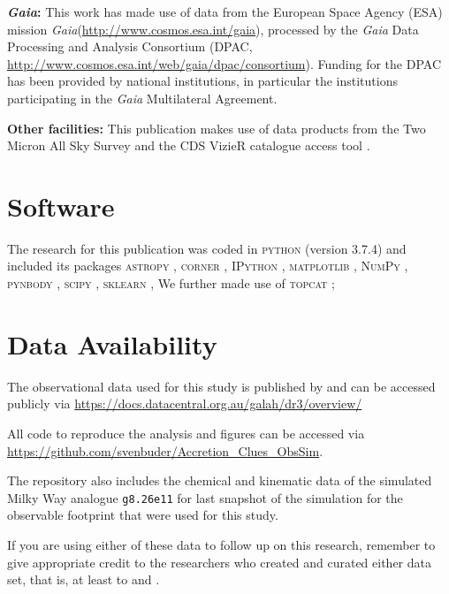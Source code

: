 \documentclass[fleqn,usenatbib]{mnras}
\newcommand{\Gaia}{\textit{Gaia}\xspace} %
\begin{document}
\textbf{\Gaia: } This work has made use of data from the European Space Agency (ESA) mission \Gaia (\url{http://www.cosmos.esa.int/gaia}), processed by the \Gaia Data Processing and Analysis Consortium (DPAC, \url{http://www.cosmos.esa.int/web/gaia/dpac/consortium}). Funding for the DPAC has been provided by national institutions, in particular the institutions participating in the \Gaia Multilateral Agreement. 

\textbf{Other facilities:} This publication makes use of data products from the Two Micron All Sky Survey \citep{Skrutskie2006} and the CDS VizieR catalogue access tool \citep{Vizier2000}.

\section*{Software}

The research for this publication was coded in \textsc{python} (version 3.7.4) and included its packages
\textsc{astropy} \citep[v. 3.2.2;][]{Robitaille2013,PriceWhelan2018},
\textsc{corner} \citep[v. 2.0.1;][]{corner},
\textsc{IPython} \citep[v. 7.8.0;][]{ipython},
\textsc{matplotlib} \citep[v. 3.1.3;][]{matplotlib},
\textsc{NumPy} \citep[v. 1.17.2;][]{numpy},
\textsc{pynbody} \citep[v. 1.1.0;][]{pynbody},
\textsc{scipy} \citep[version 1.3.1;][]{scipy},
\textsc{sklearn} \citep[v. 0.21.3;][]{scikit-learn},
We further made use of \textsc{topcat} \citep[version 4.7;][]{Taylor2005};

\section*{Data Availability}

The observational data used for this study is published by \citet{Buder2021} and can be accessed publicly via \url{https://docs.datacentral.org.au/galah/dr3/overview/}

All code to reproduce the analysis and figures can be accessed via \url{https://github.com/svenbuder/Accretion_Clues_ObsSim}.

The repository also includes the chemical and kinematic data of the simulated Milky Way analogue \texttt{g8.26e11} for last snapshot of the simulation for the observable footprint that were used for this study.

If you are using either of these data to follow up on this research, remember to give appropriate credit to the researchers who created and curated either data set, that is, at least to \citet{Buder2021, Buder2022} and \citet{Buck2020b, Buck2021}.
\end{document}
